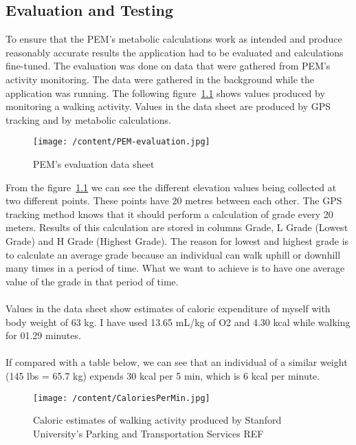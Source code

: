 \documentclass[12pt, a4paper]{report}   %
\begin{document}
\begin{enumerate}
	
\clearpage
\chapter{Evaluation and Testing}
To ensure that the PEM's metabolic calculations work as intended and produce reasonably accurate results the application had to be evaluated and calculations fine-tuned. The evaluation was done on data that were gathered from PEM's activity monitoring. The data were gathered in the background while the application was running. The following figure~\ref{PEM-evaluation} shows values produced by monitoring a walking activity. Values in the data sheet are produced by GPS tracking and by metabolic calculations.\\


\begin{figure}[H]
\begin{sideways}
\begin{minipage}{19cm}
	\texttt{[image: /content/PEM-evaluation.jpg]}
	\caption{PEM's evaluation data sheet}
	\label{PEM-evaluation}
\end{minipage}
\end{sideways}
\centering
\end{figure}


\clearpage
From the figure~\ref{PEM-evaluation} we can see the different elevation values being collected at two different points. These points have 20 metres between each other. The GPS tracking method knows that it should perform a calculation of grade every 20 meters. Results of this calculation are stored in columns Grade, L Grade (Lowest Grade) and H Grade (Highest Grade). The reason for lowest and highest grade is to calculate an average grade because an individual can walk uphill or downhill many times in a period of time. What we want to achieve is to have one average value of the grade in that period of time.\\ \\
Values in the data sheet show estimates of caloric expenditure of myself with body weight of 63 kg. I have used 13.65 mL/kg of O2 and 4.30 kcal while walking for 01.29 minutes.\\ \\
If compared with a table below, we can see that an individual of a similar weight (145 lbs = 65.7 kg) expends 30 kcal per 5 min, which is 6 kcal per minute.\\


\begin{figure}[H]
  \centering
	\texttt{[image: /content/CaloriesPerMin.jpg]}
	  \caption{Caloric estimates of walking activity produced by Stanford University's Parking and Transportation Services REF}
\end{figure}



\end{enumerate}
\end{document}

